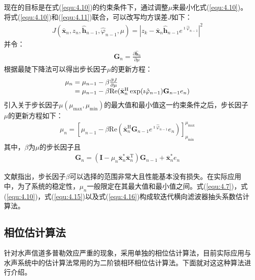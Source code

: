 现在的目标是在式(\ref{equ:4.10})的约束条件下，通过调整$\mu$来最小化式(\ref{equ:4.10})。将式(\ref{equ:4.10})和(\ref{equ:4.11})联合，可以改写均方误差$J$如下：
\begin{eqnarray}
    J(\bar{\mathbf{x}}_n,z_n,\hat{\mathbf{h}}_{n-1},\hat{\varphi}_{n-1},\mu)=|z_k-\bar{\mathbf{x}}_n\hat{\mathbf{h}}_{n-1}e^{\imath\hat{\varphi}_{n-1}}|^2
    \label{equ:4.12}
\end{eqnarray}
并令：
\begin{eqnarray}
    \mathbf{G}_n=\frac{\partial\hat{\mathbf{h}}_n}{\partial\mu}
    \label{equ:4.13}
\end{eqnarray}
根据最陡下降法可以得出步长因子$\mu$的更新方程：
\begin{eqnarray}
    \begin{array}{l@{\;=\;}l}
    \mu_n&\mu_{n-1}-\beta\frac{\partial J}{\partial\mu}\\
    &\mu_{n-1}-\beta\mathrm{Re}(\bar{\mathbf{x}}_n^{\mathrm{H}}\exp(\imath\hat{\varphi}_{n-1})\mathbf{G}_{n-1}e_n)
    \end{array}
    \label{equ:4.14}
\end{eqnarray}
引入关于步长因子$\mu(\mu_{\max},\mu_{\min})$的最大值和最小值这一约束条件之后，步长因子$\mu$的更新方程如下：
\begin{eqnarray}
    \mu_n=[\mu_{n-1}-\beta\mathrm{Re}(\bar{\mathbf{x}}_n^{\mathrm{H}}\mathbf{G}_{n-1}e^{\imath\hat{\varphi}_{n-1}}e_n)]_{\mu_{\min}}^{\mu_{\max}}
    \label{equ:4.15}
\end{eqnarray}
其中，$\beta$为$\mu$的步长因子且
\begin{eqnarray}
    \mathbf{G}_n=(\mathbf{I}-\mu_n\bar{\mathbf{x}}_n^*\bar{\mathbf{x}}_n^{\mathrm{T}})\mathbf{G}_{n-1}+\bar{\mathbf{x}}_{n}^*e_n
    \label{equ:4.16}
\end{eqnarray}

文献指出，步长因子$\beta$可以选择的范围非常大且性能基本没有损失。在实际应用中，为了系统的稳定性，$\mu_n$一般限定在其最大值和最小值之间。式(\ref{equ:4.7})，式(\ref{equ:4.10})，式(\ref{equ:4.15})以及式(\ref{equ:4.16})构成软迭代横向滤波器抽头系数估计算法。
\subsection{相位估计算法}
针对水声信道多普勒效应严重的现象，采用单独的相位估计算法，目前实际应用与水声系统中的估计算法常用的为二阶锁相环相位估计算法。下面就对这这种算法进行介绍。
